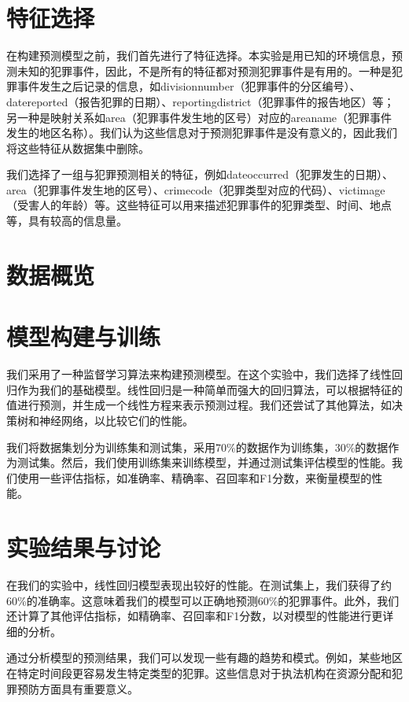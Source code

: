 \documentclass{article}
\begin{document}
\section{特征选择}
在构建预测模型之前，我们首先进行了特征选择。本实验是用已知的环境信息，预测未知的犯罪事件，因此，不是所有的特征都对预测犯罪事件是有用的。一种是犯罪事件发生之后记录的信息，如division\textunderscore{}number（犯罪事件的分区编号）、date\textunderscore{}reported（报告犯罪的日期）、reporting\textunderscore{}district（犯罪事件的报告地区）等；另一种是映射关系如area（犯罪事件发生地的区号）对应的area\textunderscore{}name（犯罪事件发生的地区名称）。我们认为这些信息对于预测犯罪事件是没有意义的，因此我们将这些特征从数据集中删除。

我们选择了一组与犯罪预测相关的特征，例如date\textunderscore{}occurred（犯罪发生的日期）、area（犯罪事件发生地的区号）、crime\textunderscore{}code（犯罪类型对应的代码）、victim\textunderscore{}age（受害人的年龄）等。这些特征可以用来描述犯罪事件的犯罪类型、时间、地点等，具有较高的信息量。

\section{数据概览}

\section{模型构建与训练}
我们采用了一种监督学习算法来构建预测模型。在这个实验中，我们选择了线性回归作为我们的基础模型。线性回归是一种简单而强大的回归算法，可以根据特征的值进行预测，并生成一个线性方程来表示预测过程。我们还尝试了其他算法，如决策树和神经网络，以比较它们的性能。

我们将数据集划分为训练集和测试集，采用70\%的数据作为训练集，30\%的数据作为测试集。然后，我们使用训练集来训练模型，并通过测试集评估模型的性能。我们使用一些评估指标，如准确率、精确率、召回率和F1分数，来衡量模型的性能。

\section{实验结果与讨论}
在我们的实验中，线性回归模型表现出较好的性能。在测试集上，我们获得了约60\%的准确率。这意味着我们的模型可以正确地预测60\%的犯罪事件。此外，我们还计算了其他评估指标，如精确率、召回率和F1分数，以对模型的性能进行更详细的分析。

通过分析模型的预测结果，我们可以发现一些有趣的趋势和模式。例如，某些地区在特定时间段更容易发生特定类型的犯罪。这些信息对于执法机构在资源分配和犯罪预防方面具有重要意义。
\end{document}
